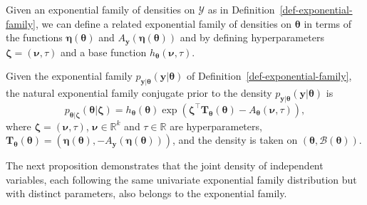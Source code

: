 Given an exponential family of densities on $\mathcal{Y}$ as in Definition~\ref{def-exponential-family}, we can define a related exponential family of densities on $\boldsymbol{\theta}$ in terms of the functions $\boldsymbol{\eta}(\boldsymbol{\theta})$ and $A_{\mathbf{y}}(\boldsymbol{\eta}(\boldsymbol{\theta}))$ and by defining hyperparameters $\boldsymbol{\zeta} = (\boldsymbol{\nu}, \tau)$ and a base function $h_{\boldsymbol{\theta}}(\boldsymbol{\nu}, \tau)$.

\begin{definition}
\label{def-exponential-family-conjugate}
Given the exponential family $p_{\mathbf{y}\vert\boldsymbol{\theta}}(\mathbf{y} \vert \boldsymbol{\theta})$ of Definition~\ref{def-exponential-family}, 
the natural exponential family conjugate prior to the density $p_{\mathbf{y}\vert\boldsymbol{\theta}}(\mathbf{y} \vert \boldsymbol{\theta})$ is
\begin{equation*}
\label{eq:exponential-family-conjugate}
p_{\boldsymbol{\theta}|\boldsymbol{\zeta}}(\boldsymbol{\theta}|\boldsymbol{\zeta}) = h_{\boldsymbol{\theta}}(\boldsymbol{\theta}) \exp \left(\boldsymbol{\zeta}^\top  \mathbf{T}_{\boldsymbol{\theta}}(\boldsymbol{\theta}) -  A_{\boldsymbol{\theta}}(\boldsymbol{\nu}, \tau) \right),
\end{equation*}
where $\boldsymbol{\zeta} = (\boldsymbol{\nu}, \tau)$, $\boldsymbol{\nu} \in \mathbb{R}^{k}$ and  $\tau \in \mathbb{R}$ are hyperparameters, $ \mathbf{T}_{\boldsymbol{\theta}}(\boldsymbol{\theta}) = (\boldsymbol{\eta}(\boldsymbol{\theta}), -A_{\mathbf{y}}(\boldsymbol{\eta}(\boldsymbol{\theta})))$,  and the density is taken on $(\boldsymbol{\theta}, \mathcal{B}(\boldsymbol{\theta}))$.
\end{definition}
The next proposition demonstrates that the joint density of independent variables, each following the same univariate exponential family distribution but with distinct parameters, also belongs to the exponential family. 
